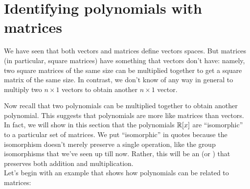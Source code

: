 \section{Identifying polynomials with matrices}\label{sec:ringIsoPolyMat}

We have seen that both vectors and matrices define vectors spaces.  But matrices (in particular, square matrices) have something that vectors don't have: namely, two square matrices of the same size can be multiplied together to get a square matrix of the same size.  In contrast, we don't know of any way in general to multiply two $n \times 1$ vectors to obtain another $n \times 1$ vector. 

Now recall that two polynomials can be multiplied together to obtain another polynomial. This suggests that polynomials are more like matrices than vectors. In fact, we will show in this section that the polynomials $\mathbb{R}[x]$ are ``isomorphic'' to a particular set of matrices.  We put ``isomorphic'' in quotes because the isomorphism doesn't merely preserve a single operation, like the group isomorphisms  that we've seen up till now. Rather, this will be an  (or ) that preserves both addition and multiplication.\\
Let's begin with an example that shows how polynomials can be related to matrices:

